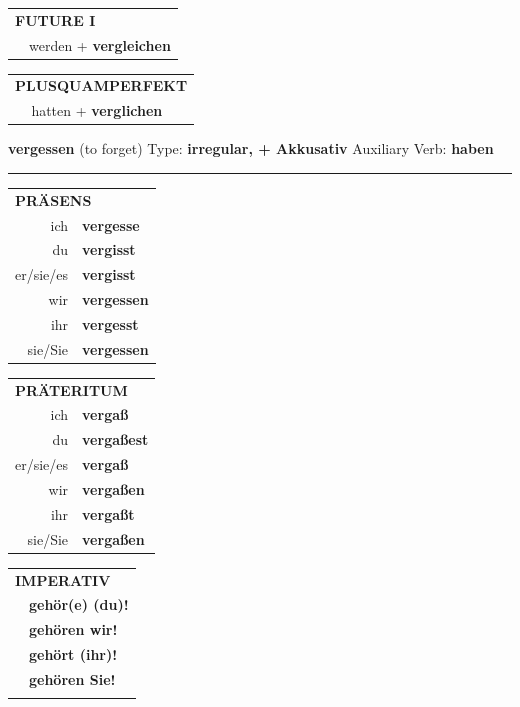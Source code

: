 \documentclass[10pt,a4paper]{revtex4-2}
\begin{document}
\begin{verbbox-dat}
\begin{tabular}{rl}
    \multicolumn{2}{l}{\textbf{FUTURE I} }\\
  &  werden + \textbf{vergleichen}\\
 
  \end{tabular}
\hfill
   \begin{tabular}{rl}
      \multicolumn{2}{l}{\textbf{PLUSQUAMPERFEKT}}\\
  &  hatten + \textbf{verglichen}\\
  \end{tabular}
  
  \vspace{-5pt}


\end{verbbox-dat}

\begin{verbbox-acc}
    {\Large \bf vergessen} (to forget) \hfill Type: \textbf{irregular, + Akkusativ} \hfill Auxiliary Verb: \textbf{haben} 
    
     \vspace{5pt}

    \hrule
    
    \vspace{5pt}

  \begin{tabular}{rl}
     \multicolumn{2}{l}{\textbf{PRÄSENS} }\\
    ich & \textbf{vergesse}\\
    du & \textbf{vergisst}\\
    er/sie/es & \textbf{vergisst}\\
    wir & \textbf{vergessen}\\
    ihr & \textbf{vergesst}\\
    sie/Sie & \textbf{vergessen}\\
  \end{tabular}
  \hfill
     \begin{tabular}{rl}
    \multicolumn{2}{l}{\textbf{PRÄTERITUM} }\\
    ich & \textbf{vergaß}\\
    du & \textbf{vergaßest}\\
    er/sie/es & \textbf{vergaß}\\
    wir & \textbf{vergaßen}\\
    ihr & \textbf{vergaßt}\\
    sie/Sie & \textbf{vergaßen}\\
  \end{tabular}
  \hfill
  \begin{tabular}{rl}
     \multicolumn{2}{l}{\textbf{IMPERATIV} }\\
   & \textbf{gehör(e) (du)!}\\
   & \textbf{gehören wir!}\\
   & \textbf{gehört (ihr)!}\\
   & \textbf{gehören Sie!}\\
   & \vspace{10pt}
  \end{tabular}


\end{verbbox-acc}
\end{document}
